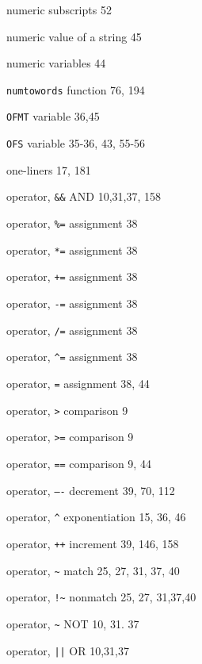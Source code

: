 \begin{multicols}{3}
\hangindent=4pc  numeric subscripts 52

\hangindent=4pc  numeric value of a string 45

\hangindent=4pc  numeric variables 44

\hangindent=4pc  \verb'numtowords' function 76, 194

\hangindent=4pc  \verb'OFMT' variable 36,45

\hangindent=4pc  \verb'OFS' variable 35-36, 43, 55-56

\hangindent=4pc  one-liners 17, 181

\hangindent=4pc  operator, \verb'&&' AND 10,31,37, 158

\hangindent=4pc  operator, \verb'%=' assignment 38

\hangindent=4pc  operator, \verb'*=' assignment 38

\hangindent=4pc  operator, \verb'+=' assignment 38

\hangindent=4pc  operator, \verb'-=' assignment 38

\hangindent=4pc  operator, \verb'/=' assignment 38

\hangindent=4pc  operator, \verb'^=' assignment 38

\hangindent=4pc  operator, \verb'=' assignment 38, 44

\hangindent=4pc  operator, \verb'>' comparison 9

\hangindent=4pc  operator, \verb'>=' comparison 9

\hangindent=4pc  operator, \verb'==' comparison 9, 44

\hangindent=4pc  operator, \verb'—-' decrement 39, 70, 112

\hangindent=4pc  operator, \verb'^' exponentiation 15, 36, 46

\hangindent=4pc  operator, \verb'++' increment 39, 146, 158

\hangindent=4pc  operator, \verb'~' match 25, 27, 31, 37, 40

\hangindent=4pc  operator, \verb'!~' nonmatch 25, 27, 31,37,40

\hangindent=4pc  operator, \verb'~' NOT 10, 31. 37

\hangindent=4pc  operator, \verb'||' OR 10,31,37


\end{multicols}
